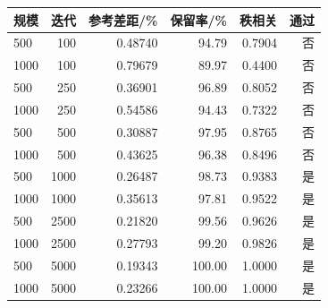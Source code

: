 \begin{tabular}{@{}lrrrrr@{}}
\toprule
规模 & 迭代 & 参考差距/\% & 保留率/\% & 秩相关 & 通过 \\ \midrule
500 & 100 & 0.48740 & 94.79 & 0.7904 & 否 \\
1000 & 100 & 0.79679 & 89.97 & 0.4400 & 否 \\
500 & 250 & 0.36901 & 96.89 & 0.8052 & 否 \\
1000 & 250 & 0.54586 & 94.43 & 0.7322 & 否 \\
500 & 500 & 0.30887 & 97.95 & 0.8765 & 否 \\
1000 & 500 & 0.43625 & 96.38 & 0.8496 & 否 \\
500 & 1000 & 0.26487 & 98.73 & 0.9383 & 是 \\
1000 & 1000 & 0.35613 & 97.81 & 0.9522 & 是 \\
500 & 2500 & 0.21820 & 99.56 & 0.9626 & 是 \\
1000 & 2500 & 0.27793 & 99.20 & 0.9826 & 是 \\
500 & 5000 & 0.19343 & 100.00 & 1.0000 & 是 \\
1000 & 5000 & 0.23266 & 100.00 & 1.0000 & 是 \\
\bottomrule
\end{tabular}
